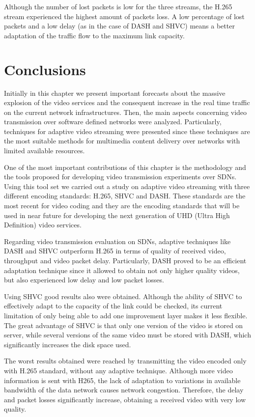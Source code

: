 Although the number of lost packets is low for the three streams, the H.265 stream experienced the highest amount of packets loss. A low percentage of lost packets and a low delay (as in the case of DASH and SHVC) means a better adaptation of the traffic flow to the maximum link capacity. 

\section{Conclusions}
\label{sec:4.6}

Initially in this chapter we present important forecasts about the massive explosion of the video services and the consequent increase in the real time traffic on the current network infrastructures. Then, the main aspects concerning video transmission over software defined networks were analyzed. Particularly, techniques for adaptive video streaming were presented since these techniques are the most suitable methods for multimedia content delivery over networks with limited available resources. 

One of the most important contributions of this chapter is the methodology and  the tools proposed for developing video transmission experiments over SDNs. Using this tool set we carried out a study on adaptive video streaming with three different encoding standards: H.265, SHVC and DASH. These standards are the most recent for video coding and they are the encoding standards that will be used in near future for developing the next generation of UHD (Ultra High Definition) video services.

Regarding video transmission evaluation on SDNs, adaptive techniques like DASH and SHVC outperform H.265 in terms of quality of received video, throughput and video packet delay. Particularly, DASH proved to be an efficient adaptation technique since it allowed to obtain not only higher quality videos, but also experienced low delay and low packet losses.

Using SHVC good results also were obtained. Although the ability of SHVC to effectively adapt to the capacity of the link could be checked, its current limitation of only being able to add one improvement layer makes it less flexible. The great advantage of SHVC is that only one version of the video is stored on server, while several versions of the same video must be stored with DASH, which significantly increases the disk space used.

The worst results obtained were reached by transmitting the video encoded only with H.265 standard, without any adaptive technique. Although more video information is sent with H265, the lack of adaptation to variations in available bandwidth of the data network causes network congestion. Therefore, the delay and packet losses significantly increase, obtaining a received video with very low quality.

